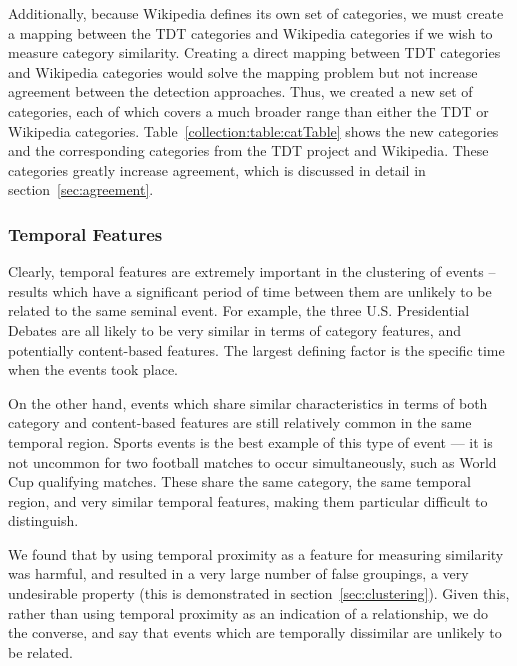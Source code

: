 Additionally, because Wikipedia defines its own set of categories, we must create a mapping between the TDT categories and Wikipedia categories if we wish to measure category similarity.
Creating a direct mapping between TDT categories and Wikipedia categories would solve the mapping problem but not increase agreement between the detection approaches.
Thus, we created a new set of categories, each of which covers a much broader range than either the TDT or Wikipedia categories.
Table~\ref{collection:table:catTable} shows the new categories and the corresponding categories from the TDT project and Wikipedia.
These categories greatly increase agreement, which is discussed in detail in section~\ref{sec:agreement}.

\subsubsection{Temporal Features}
Clearly, temporal features are extremely important in the clustering of events -- results which have a significant period of time between them are unlikely to be related to the same seminal event.
For example, the three U.S. Presidential Debates are all likely to be very similar in terms of category features, and potentially content-based features.
The largest defining factor is the specific time when the events took place.

On the other hand, events which share similar characteristics in terms of both category and content-based features are still relatively common in the same temporal region.
Sports events is the best example of this type of event --- it is not uncommon for two football matches to occur simultaneously, such as World Cup qualifying matches.
These share the same category, the same temporal region, and very similar temporal features, making them particular difficult to distinguish.

We found that by using temporal proximity as a feature for measuring similarity was harmful, and resulted in a very large number of false groupings, a very undesirable property (this is demonstrated in section~\ref{sec:clustering}).
Given this, rather than using temporal proximity as an indication of a relationship, we do the converse, and say that events which are temporally dissimilar are unlikely to be related.

